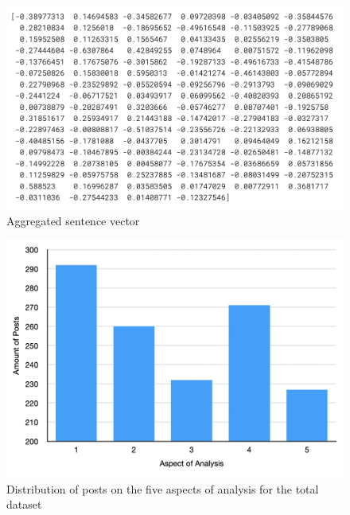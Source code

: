 \documentclass[english,bachelor]{swsLeipzig}
\begin{document}
\begin{figure}[h]
  \centering
  \includegraphics[width=1\textwidth]{images/vecsentence.png}
  \caption{Aggregated sentence vector}
  \label{fig:appendix2}
\end{figure}

\begin{figure}[h]
  \centering
  \includegraphics[width=1\textwidth]{images/table_setA.png}
  \caption{Distribution of posts on the five aspects of analysis for the total dataset}
  \label{fig:appendix3}
\end{figure}
\end{document}
